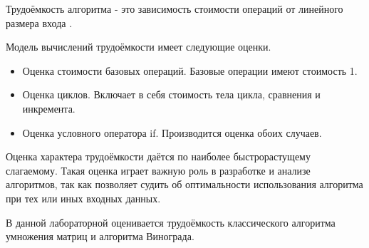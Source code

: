 Трудоёмкость алгоритма - это зависимость стоимости операций от линейного размера входа \cite{perf_def}.

Модель вычислений трудоёмкости имеет следующие оценки.
\begin{itemize}
	\item Оценка стоимости базовых операций. Базовые операции имеют стоимость 1.
	\item Оценка циклов. Включает в себя стоимость тела цикла, сравнения и инкремента.
	\item Оценка условного оператора if. Производится оценка обоих случаев.
\end{itemize}

Оценка характера трудоёмкости даётся по наиболее быстрорастущему слагаемому. Такая оценка играет важную роль в 
разработке и анализе алгоритмов, так как позволяет судить об оптимальности использования алгоритма при тех или
иных входных данных.

В данной лабораторной оценивается трудоёмкость классического алгоритма умножения матриц и алгоритма Винограда. 
